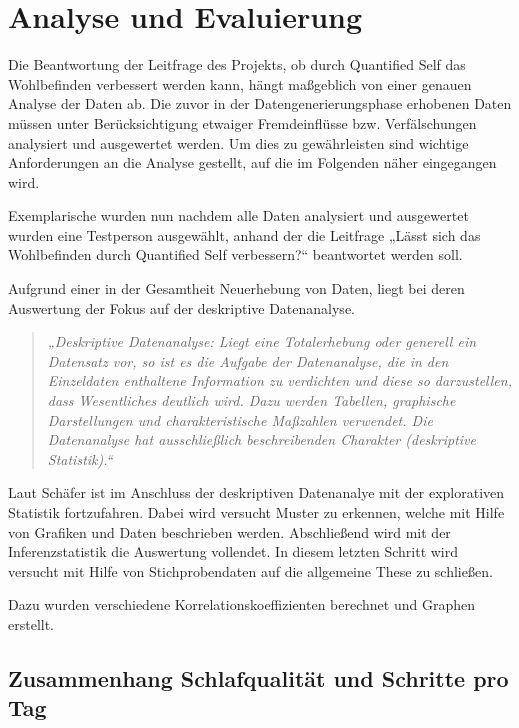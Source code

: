 
\chapter{Analyse und Evaluierung}
\label{ch:AnalyseUndEvaluierung}

Die Beantwortung der Leitfrage des Projekts, ob durch Quantified Self das Wohlbefinden verbessert werden kann, hängt maßgeblich von einer genauen Analyse der Daten ab. 
Die zuvor in der Datengenerierungsphase erhobenen Daten müssen unter Berücksichtigung etwaiger Fremdeinflüsse bzw. Verfälschungen analysiert und ausgewertet werden.
Um dies zu gewährleisten sind wichtige Anforderungen an die Analyse gestellt, auf die im Folgenden näher eingegangen wird.

Exemplarische wurden nun nachdem alle Daten analysiert und ausgewertet wurden eine Testperson ausgewählt, anhand der die Leitfrage „Lässt sich das Wohlbefinden durch Quantified Self verbessern?“ beantwortet werden soll.

Aufgrund einer in der Gesamtheit Neuerhebung von Daten, liegt bei deren Auswertung der Fokus auf der deskriptive Datenanalyse.

\begin{quote}
\textit{„Deskriptive Datenanalyse: Liegt eine Totalerhebung oder generell ein Datensatz vor, so ist es die Aufgabe der Datenanalyse, die in den Einzeldaten enthaltene Information zu verdichten und diese so darzustellen, dass Wesentliches deutlich wird. Dazu werden Tabellen, graphische Darstellungen und charakteristische Maßzahlen verwendet.  Die Datenanalyse hat ausschließlich beschreibenden Charakter (deskriptive Statistik).“} 
\end{quote}
\cite[Springer Gabler Wirtschaftslexikon]{web:SpringerDatenanalyse}


Laut Schäfer\cite{Schafer2010} ist im Anschluss der deskriptiven Datenanalye mit der explorativen Statistik fortzufahren.
Dabei wird versucht Muster zu erkennen, welche mit Hilfe von Grafiken und Daten beschrieben werden.
Abschließend wird mit der Inferenzstatistik die Auswertung vollendet.
In diesem letzten Schritt wird versucht mit Hilfe von Stichprobendaten auf die allgemeine These zu schließen.

Dazu wurden verschiedene Korrelationskoeffizienten berechnet und Graphen erstellt.


\section{Zusammenhang Schlafqualität und Schritte pro Tag}
\label{ch:AnalyseUndEvaluierung:sec:ZusammenhangSchlafqualitätProSchrittenAmTag}

